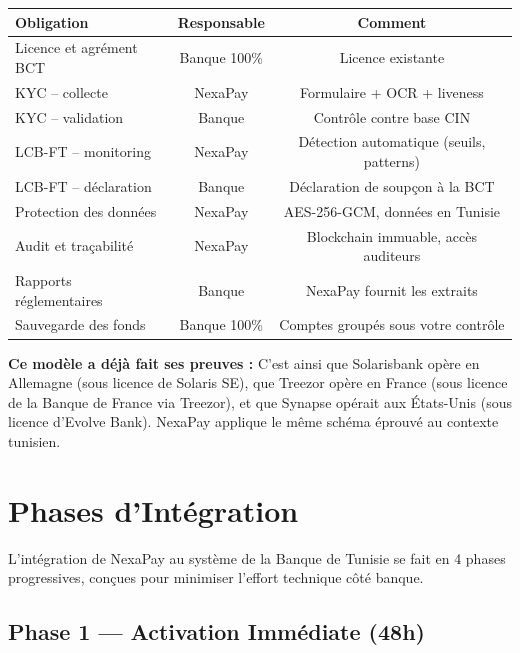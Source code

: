 \documentclass[11pt,a4paper]{article}
\begin{document}
\begin{center}
\begin{tabular}{|l|c|c|}
\hline
\textbf{Obligation} & \textbf{Responsable} & \textbf{Comment} \\
\hline
Licence et agrément BCT       & Banque 100\%   & Licence existante \\
KYC -- collecte               & NexaPay        & Formulaire + OCR + liveness \\
KYC -- validation             & Banque         & Contr\^ole contre base CIN \\
LCB-FT -- monitoring          & NexaPay        & D\'etection automatique (seuils, patterns) \\
LCB-FT -- d\'eclaration       & Banque         & D\'eclaration de soup\c{c}on \`a la BCT \\
Protection des donn\'ees      & NexaPay        & AES-256-GCM, donn\'ees en Tunisie \\
Audit et tra\c{c}abilit\'e   & NexaPay        & Blockchain immuable, acc\`es auditeurs \\
Rapports r\'eglementaires     & Banque         & NexaPay fournit les extraits \\
Sauvegarde des fonds          & Banque 100\%   & Comptes group\'es sous votre contr\^ole \\
\hline
\end{tabular}
\end{center}

\textbf{Ce mod\`ele a d\'ej\`a fait ses preuves :} C'est ainsi que Solarisbank op\`ere en Allemagne (sous licence de Solaris SE), que Treezor op\`ere en France (sous licence de la Banque de France via Treezor), et que Synapse op\'erait aux \'Etats-Unis (sous licence d'Evolve Bank). NexaPay applique le m\^eme sch\'ema \'eprouv\'e au contexte tunisien.

\newpage

\section{Phases d'Int\'egration}

L'int\'egration de NexaPay au syst\`eme de la Banque de Tunisie se fait en 4 phases progressives, con\c{c}ues pour minimiser l'effort technique c\^ot\'e banque.

\subsection{Phase 1 --- Activation Imm\'ediate (48h)}
\end{document}
